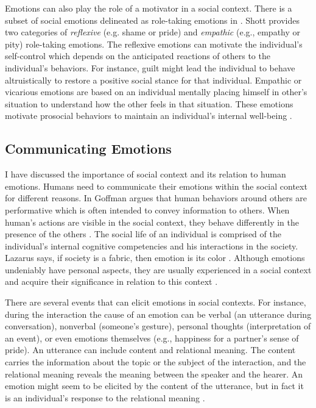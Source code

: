 \documentclass[12pt]{report}
\begin{document}
Emotions can also play the role of a motivator in a social context. There is a
subset of social emotions delineated as role-taking emotions in
\cite{shott:emotion-social-life}. Shott provides two categories of
\textit{reflexive} (e.g. shame or pride) and \textit{empathic} (e.g., empathy or
pity) role-taking emotions. The reflexive emotions can motivate the individual's
self-control which depends on the anticipated reactions of others to the
individual's behaviors. For instance, guilt might lead the individual to behave
altruistically to restore a positive social stance for that individual. Empathic
or vicarious emotions are based on an individual mentally placing himself in
other's situation to understand how the other feels in that situation. These
emotions motivate prosocial behaviors to maintain an individual's internal
well-being \cite{thoits:socialogy-emotion}.

\subsection{Communicating Emotions}
\label{section-emotion-comm}

I have discussed the importance of social context and its relation to human
emotions. Humans need to communicate their emotions within the social context
for different reasons. In \cite{goffman:self-presentation} Goffman argues that
human behaviors around others are performative which is often intended to convey
information to others. When human's actions are visible in the social context,
they behave differently in the presence of the others
\cite{zajonc:social-facilitation}. The social life of an individual is comprised
of the individual's internal cognitive competencies and his interactions in the
society. Lazarus says, if society is a fabric, then emotion is its color
\cite{lazarus:emotion-adaptation}. Although emotions undeniably have personal
aspects, they are usually experienced in a social context and acquire their
significance in relation to this context
\cite{parkinson:emotion-social-interaction}.

There are several events that can elicit emotions in social contexts. For
instance, during the interaction the cause of an emotion can be verbal (an
utterance during conversation), nonverbal (someone's gesture), personal thoughts
(interpretation of an event), or even emotions themselves (e.g., happiness for a
partner's sense of pride). An utterance can include content and relational
meaning. The content carries the information about the topic or the subject of
the interaction, and the relational meaning reveals the meaning between the
speaker and the hearer. An emotion might seem to be elicited by the content of
the utterance, but in fact it is an individual's response to the relational
meaning \cite{planalp:communicating-emotion}. 
\end{document}
